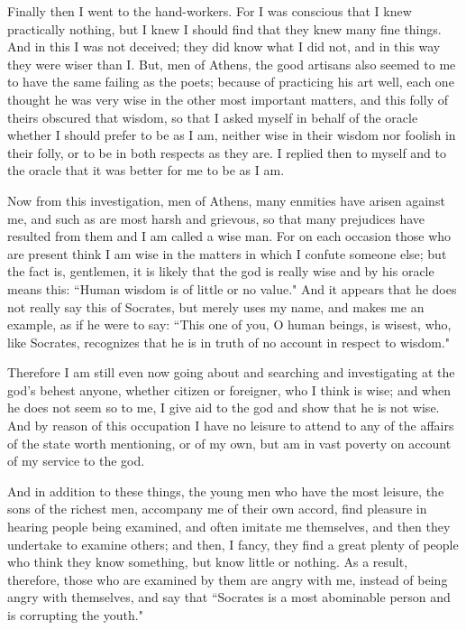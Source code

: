 \documentclass[letterpaper,12pt]{article}
\newcommand{\stephpag}[1]{\marginnote{\small\itshape\fontfamily{ppl}\selectfont #1}}
\begin{document}
Finally then I went to the hand-workers. \stephpag{d} For I was conscious that I knew practically nothing, but I knew I should find that they knew many fine things. And in this I was not deceived; they did know what I did not, and in this way they were wiser than I. But, men of Athens, the good artisans also seemed to me to have the same failing as the poets; because of practicing his art well, each one thought he was very wise in the other most important matters, and this folly of theirs obscured that wisdom, so that I asked myself \stephpag{e} in behalf of the oracle whether I should prefer to be as I am, neither wise in their wisdom nor foolish in their folly, or to be in both respects as they are. I replied then to myself and to the oracle that it was better for me to be as I am.

Now from this investigation, men of Athens, \stephpag{23 a} many enmities have arisen against me, and such as are most harsh and grievous, so that many prejudices have resulted from them and I am called a wise man. For on each occasion those who are present think I am wise in the matters in which I confute someone else; but the fact is, gentlemen, it is likely that the god is really wise and by his oracle means this: ``Human wisdom is of little or no value." And it appears that he does not really say this of Socrates, but merely uses my name, \stephpag{b} and makes me an example, as if he were to say: ``This one of you, O human beings, is wisest, who, like Socrates, recognizes that he is in truth of no account in respect to wisdom."

Therefore I am still even now going about and searching and investigating at the god's behest anyone, whether citizen or foreigner, who I think is wise; and when he does not seem so to me, I give aid to the god and show that he is not wise. And by reason of this occupation I have no leisure to attend to any of the affairs of the state worth mentioning, or of my own, but am in vast poverty \stephpag{c} on account of my service to the god.

And in addition to these things, the young men who have the most leisure, the sons of the richest men, accompany me of their own accord, find pleasure in hearing people being examined, and often imitate me themselves, and then they undertake to examine others; and then, I fancy, they find a great plenty of people who think they know something, but know little or nothing. As a result, therefore, those who are examined by them are angry with me, instead of being angry with themselves, and say that ``Socrates is a most abominable person \stephpag{d} and is corrupting the youth."
\end{document}
